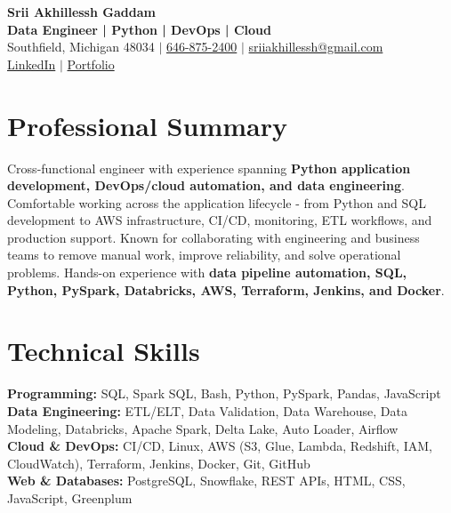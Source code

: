 \documentclass[letterpaper,10pt]{article}
\begin{document}
\fontsize{9.35pt}{10.45pt}\selectfont

\begin{center}
    {\LARGE \textbf{Srii Akhillessh Gaddam}} \\[-1pt]
    \textbf{Data Engineer | Python | DevOps | Cloud} \\[2pt]
    Southfield, Michigan 48034 $|$
    \href{tel:6468752400}{646-875-2400} $|$
    \href{mailto:sriiakhillessh@gmail.com}{sriiakhillessh@gmail.com} \\[1pt]
    \href{https://www.linkedin.com/in/srii-akhiilessh-gaddam-b48668191/}{LinkedIn} $|$
    \href{https://sriiakhillesshg.github.io/portfolio/}{Portfolio}
\end{center}
\vspace{-8pt}

\section{Professional Summary}
\small{Cross-functional engineer with experience spanning \textbf{Python application development, DevOps/cloud automation, and data engineering}. Comfortable working across the application lifecycle - from Python and SQL development to AWS infrastructure, CI/CD, monitoring, ETL workflows, and production support. Known for collaborating with engineering and business teams to remove manual work, improve reliability, and solve operational problems. Hands-on experience with \textbf{data pipeline automation, SQL, Python, PySpark, Databricks, AWS, Terraform, Jenkins, and Docker}.}

\section{Technical Skills}
\small{
\textbf{Programming:} SQL, Spark SQL, Bash, Python, PySpark, Pandas, JavaScript \\
\textbf{Data Engineering:} ETL/ELT, Data Validation, Data Warehouse, Data Modeling, Databricks, Apache Spark, Delta Lake, Auto Loader, Airflow \\
\textbf{Cloud \& DevOps:} CI/CD, Linux, AWS (S3, Glue, Lambda, Redshift, IAM, CloudWatch), Terraform, Jenkins, Docker, Git, GitHub \\
\textbf{Web \& Databases:} PostgreSQL, Snowflake, REST APIs, HTML, CSS, JavaScript, Greenplum
}
\end{document}
